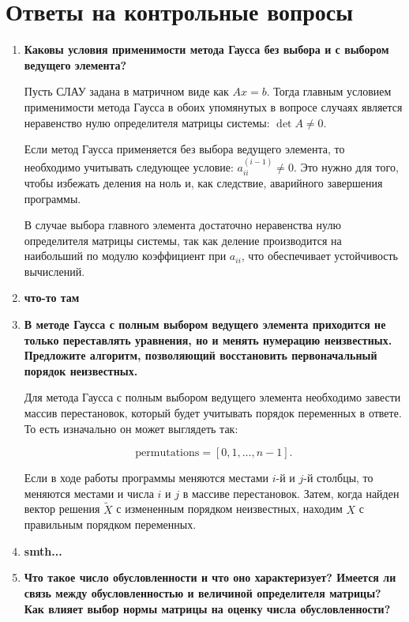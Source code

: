 \documentclass[12pt, a4paper]{article}
\begin{document}
	\section*{Ответы на контрольные вопросы}
	\begin{enumerate}
		\item \textbf{Каковы условия применимости метода Гаусса без выбора и с выбором ведущего элемента?}
		
		Пусть СЛАУ задана в матричном виде как $Ax=b$. Тогда главным условием применимости метода Гаусса в обоих упомянутых в вопросе случаях является неравенство нулю определителя матрицы системы: $\det A\neq0$.
		
		Если метод Гаусса применяется без выбора ведущего элемента, то необходимо учитывать следующее условие: $a_{ii}^{(i-1)}\neq0$. Это нужно для того, чтобы избежать деления на ноль и, как следствие, аварийного завершения программы.
		
		В случае выбора главного элемента достаточно неравенства нулю определителя матрицы системы, так как деление производится на наибольший по модулю коэффициент при $a_{ii}$, что обеспечивает устойчивость вычислений.
		
		\item \textbf{что-то там}
		
		\item\textbf{В методе Гаусса с полным выбором ведущего элемента
		приходится не только переставлять уравнения, но и менять нумерацию неизвестных. Предложите алгоритм, позволяющий восстановить первоначальный порядок неизвестных.}
		
		Для метода Гаусса с полным выбором ведущего элемента необходимо завести массив перестановок, который будет учитывать порядок переменных в ответе. То есть изначально он может выглядеть так:
		
		$$
		\text{permutations} = [0,1,\dots,n-1].
		$$
		
		Если в ходе работы программы меняются местами $i$-й и $j$-й столбцы, то меняются местами и числа $i$ и $j$ в массиве перестановок. Затем, когда найден вектор решения $\tilde{X}$ с измененным порядком неизвестных, находим $X$ с правильным порядком переменных.
		
		\item \textbf{smth...}
		
		\item \textbf{Что такое число обусловленности и что оно характеризует? Имеется ли связь между обусловленностью и величиной определителя матрицы? Как влияет выбор нормы матрицы на оценку числа обусловленности?}
		

\end{enumerate}
\end{document}
